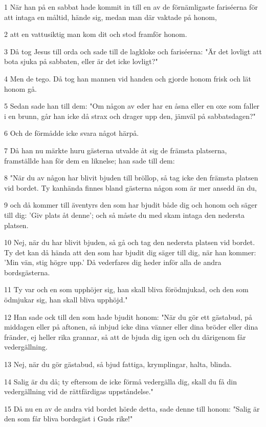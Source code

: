 \par 1 När han på en sabbat hade kommit in till en av de förnämligaste fariséerna för att intaga en måltid, hände sig, medan man där vaktade på honom,
\par 2 att en vattusiktig man kom dit och stod framför honom.
\par 3 Då tog Jesus till orda och sade till de lagkloke och fariséerna: "Är det lovligt att bota sjuka på sabbaten, eller är det icke lovligt?"
\par 4 Men de tego. Då tog han mannen vid handen och gjorde honom frisk och lät honom gå.
\par 5 Sedan sade han till dem: "Om någon av eder har en åsna eller en oxe som faller i en brunn, går han icke då strax och drager upp den, jämväl på sabbatsdagen?"
\par 6 Och de förmådde icke svara något härpå.
\par 7 Då han nu märkte huru gästerna utvalde åt sig de främsta platserna, framställde han för dem en liknelse; han sade till dem:
\par 8 "När du av någon har blivit bjuden till bröllop, så tag icke den främsta platsen vid bordet. Ty kanhända finnes bland gästerna någon som är mer ansedd än du,
\par 9 och då kommer till äventyrs den som har bjudit både dig och honom och säger till dig: 'Giv plats åt denne'; och så måste du med skam intaga den nedersta platsen.
\par 10 Nej, när du har blivit bjuden, så gå och tag den nedersta platsen vid bordet. Ty det kan då hända att den som har bjudit dig säger till dig, när han kommer: 'Min vän, stig högre upp.' Då vederfares dig heder inför alla de andra bordsgästerna.
\par 11 Ty var och en som upphöjer sig, han skall bliva förödmjukad, och den som ödmjukar sig, han skall bliva upphöjd."
\par 12 Han sade ock till den som hade bjudit honom: "När du gör ett gästabud, på middagen eller på aftonen, så inbjud icke dina vänner eller dina bröder eller dina fränder, ej heller rika grannar, så att de bjuda dig igen och du därigenom får vedergällning.
\par 13 Nej, när du gör gästabud, så bjud fattiga, krymplingar, halta, blinda.
\par 14 Salig är du då; ty eftersom de icke förmå vedergälla dig, skall du få din vedergällning vid de rättfärdigas uppståndelse."
\par 15 Då nu en av de andra vid bordet hörde detta, sade denne till honom: "Salig är den som får bliva bordsgäst i Guds rike!"
